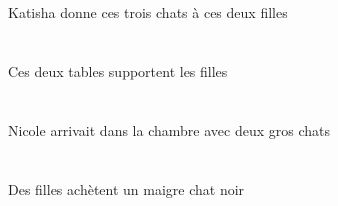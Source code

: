 \begin{exe}
\INDSgErgP{}   \KatishaASgErgP{}    \DEMDuDatP{}   \filleCDuDatP{}   \DEMPlAbsP{}   \troisDPlP{}   \chatDPlAbsP{}  \donnerVdPrsDPlP{}\\
\INDSgErgG{}   \KatishaASgErgG{}    \DEMDuDatG{}   \filleCDuDatG{}   \DEMPlAbsG{}   \troisDPlG{}   \chatDPlAbsG{}  \donnerVdPrsDPlG{}\\
Katisha donne ces trois chats à ces deux filles
\ex\glll
\DEMDuErg{}   \tableDDuErg{}   \DEFPlAbs{}   \filleCPlAbs{}  \supporterVtPrsCPl{}\\
\DEMDuErgP{}   \tableDDuErgP{}   \DEFPlAbsP{}   \filleCPlAbsP{}  \supporterVtPrsCPlP{}\\
\DEMDuErgG{}   \tableDDuErgG{}   \DEFPlAbsG{}   \filleCPlAbsG{}  \supporterVtPrsCPlG{}\\
Ces deux tables supportent les filles
\ex\glll
\INDDuObl{}   \grosDDu{}   \chatDDuObl{}   \AVEC{}   \INDSgAbs{}   \NicoleBSgAbs{}    \DEFSgObl{}   \chambreBSgObl{}   \DANS{}  \arriverViPstBSg{}\\
\INDDuOblP{}   \grosDDuP{}   \chatDDuOblP{}   \AVECP{}   \INDSgAbsP{}   \NicoleBSgAbsP{}    \DEFSgOblP{}   \chambreBSgOblP{}   \DANSP{}  \arriverViPstBSgP{}\\
\INDDuOblG{}   \grosDDuG{}   \chatDDuOblG{}   \AVECG{}   \INDSgAbsG{}   \NicoleBSgAbsG{}    \DEFSgOblG{}   \chambreBSgOblG{}   \DANSG{}  \arriverViPstBSgG{}\\
Nicole arrivait dans la chambre avec deux gros chats
\ex\glll
\INDPlErg{}   \filleCPlErg{}   \INDSgAbs{}   \maigreDSg{}   \noirDSg{}   \chatDSgAbs{}  \acheterVtPrsDSg{}\\
\INDPlErgP{}   \filleCPlErgP{}   \INDSgAbsP{}   \maigreDSgP{}   \noirDSgP{}   \chatDSgAbsP{}  \acheterVtPrsDSgP{}\\
\INDPlErgG{}   \filleCPlErgG{}   \INDSgAbsG{}   \maigreDSgG{}   \noirDSgG{}   \chatDSgAbsG{}  \acheterVtPrsDSgG{}\\
Des filles achètent un maigre chat noir
\ex\glll
\DEFSgObl{}    \DEFSgObl{}   \cuisineDSgObl{}   \DEVANT{}   \plaineASgObl{}   \DANS{}   \INDSgErg{}   \grandCSg{}   \chasseurCSgErg{}    \INDSgDat{}   \NabilDSgDat{}   \INDSgAbs{}   \petitCSg{}   \coyoteCSgAbs{}  \montrerVdPstCSg{}\\
\DEFSgOblP{}    \DEFSgOblP{}   \cuisineDSgOblP{}   \DEVANTP{}   \plaineASgOblP{}   \DANSP{}   \INDSgErgP{}   \grandCSgP{}   \chasseurCSgErgP{}    \INDSgDatP{}   \NabilDSgDatP{}   \INDSgAbsP{}   \petitCSgP{}   \coyoteCSgAbsP{}  \montrerVdPstCSgP{}\\
\DEFSgOblG{}    \DEFSgOblG{}   \cuisineDSgOblG{}   \DEVANTG{}   \plaineASgOblG{}   \DANSG{}   \INDSgErgG{}   \grandCSgG{}   \chasseurCSgErgG{}    \INDSgDatG{}   \NabilDSgDatG{}   \INDSgAbsG{}   \petitCSgG{}   \coyoteCSgAbsG{}  \montrerVdPstCSgG{}\\

\end{exe}
